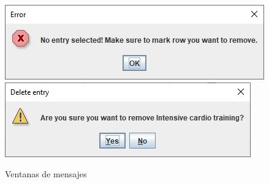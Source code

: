 \documentclass[a4paper]{article}
\begin{document}
\begin{figure}[h]
\includegraphics[width=\textwidth]{img/error.jpg}
\includegraphics[width=\textwidth]{img/delete-confirmation.jpg}
\caption{Ventanas de mensajes}
\end{figure}
\end{document}
